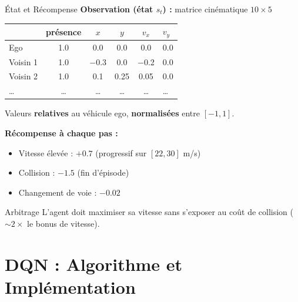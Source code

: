 \documentclass[10pt]{beamer}
\begin{document}
\begin{frame}{\'Etat et R\'ecompense}
    \textbf{Observation (\'etat $s_t$) :} matrice cin\'ematique $10 \times 5$
    \vspace{0.1cm}

    {\small
    \begin{table}
        \centering
        \begin{tabular}{lccccl}
            \toprule
            & pr\'esence & $x$ & $y$ & $v_x$ & $v_y$ \\
            \midrule
            Ego    & 1.0 & 0.0  & 0.0  & 0.0  & 0.0 \\
            Voisin 1 & 1.0 & $-$0.3 & 0.0  & $-$0.2 & 0.0 \\
            Voisin 2 & 1.0 & 0.1  & 0.25 & 0.05 & 0.0 \\
            \ldots & \ldots & \ldots & \ldots & \ldots & \ldots \\
            \bottomrule
        \end{tabular}
    \end{table}
    }

    Valeurs \textbf{relatives} au v\'ehicule ego, \textbf{normalis\'ees} entre $[-1, 1]$.

    \vspace{0.3cm}
    \textbf{R\'ecompense \`a chaque pas :}
    \begin{itemize}
        \item Vitesse \'elev\'ee : $+0.7$ (progressif sur $[22, 30]$ m/s)
        \item Collision : $-1.5$ (fin d'\'episode)
        \item Changement de voie : $-0.02$
    \end{itemize}

    \begin{block}{Arbitrage}
        L'agent doit maximiser sa vitesse sans s'exposer au co\^ut de collision ($\sim 2\times$ le bonus de vitesse).
    \end{block}
\end{frame}

\section{DQN : Algorithme et Impl\'ementation}
\end{document}
